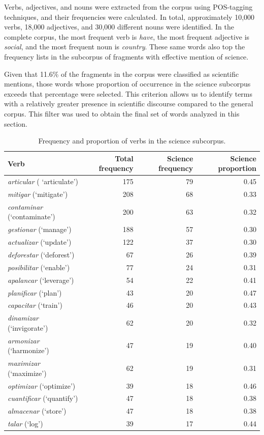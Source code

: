 \documentclass[11pt,a4paper]{article}
\begin{document}
Verbs, adjectives, and nouns were extracted from the corpus using POS-tagging techniques, and their frequencies were calculated. In total, approximately 10,000 verbs, 18,000 adjectives, and 30,000 different nouns were identified. In the complete corpus, the most frequent verb is \textit{have}, the most frequent adjective is \textit{social}, and the most frequent noun is \textit{country}. These same words also top the frequency lists in the subcorpus of fragments with effective mention of science.

Given that 11.6\% of the fragments in the corpus were classified as scientific mentions, those words whose proportion of occurrence in the science subcorpus exceeds that percentage were selected. This criterion allows us to identify terms with a relatively greater presence in scientific discourse compared to the general corpus. This filter was used to obtain the final set of words analyzed in this section.



\begin{table}[H]
	\centering
	\caption{Frequency and proportion of verbs in the science subcorpus.}
	\begin{tabular}{lrrr}
		\toprule
		\textbf{Verb} & \textbf{Total frequency} & \textbf{Science frequency} & \textbf{Science proportion} \\
		\midrule
		\textit{articular} ( `articulate')    & 175 & 79 & 0.45 \\
		\textit{mitigar} (`mitigate')        & 208 & 68 & 0.33 \\
		\textit{contaminar} (`contaminate')  & 200 & 63 & 0.32 \\
		\textit{gestionar} (`manage')        & 188 & 57 & 0.30 \\
		\textit{actualizar} (`update')       & 122 & 37 & 0.30 \\
		\textit{deforestar} (`deforest')     & 67  & 26 & 0.39 \\
		\textit{posibilitar} (`enable')      & 77  & 24 & 0.31 \\
		\textit{apalancar} (`leverage')      & 54  & 22 & 0.41 \\
		\textit{planificar} (`plan')         & 43  & 20 & 0.47 \\
		\textit{capacitar} (`train')         & 46  & 20 & 0.43 \\
		\textit{dinamizar} (`invigorate')    & 62  & 20 & 0.32 \\
		\textit{armonizar} (`harmonize')     & 47  & 19 & 0.40 \\
		\textit{maximizar} (`maximize')      & 62  & 19 & 0.31 \\
		\textit{optimizar} (`optimize')      & 39  & 18 & 0.46 \\
		\textit{cuantificar} (`quantify')    & 47  & 18 & 0.38 \\
		\textit{almacenar} (`store')         & 47  & 18 & 0.38 \\
		\textit{talar} (`log')               & 39  & 17 & 0.44 \\
		\bottomrule
	\end{tabular}
	
	\label{tab:verbos_ciencia}
\end{table}
\end{document}
